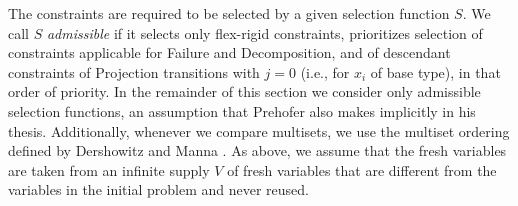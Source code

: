 The  constraints are required to be selected by a given
selection function $S$. We call $S$ \emph{admissible} if it selects only flex-rigid constraints, prioritizes
selection of constraints applicable for \textsf{Failure} and \textsf{Decomposition}, 
and of descendant constraints of
\textsf{Projection} transitions with $j=0$ (i.e., for $x_i$ of base type), in that order of priority. In the
remainder of this section we consider only admissible selection functions,
an assumption that Prehofer also makes implicitly in his thesis. Additionally,
whenever we compare multisets, we use the multiset ordering defined by
Dershowitz and Manna \cite{dm-79-multisetordering}.
As above, we assume that the fresh variables are taken from an infinite supply $V$ of fresh variables
that are different from the variables in the initial problem
and never reused.

